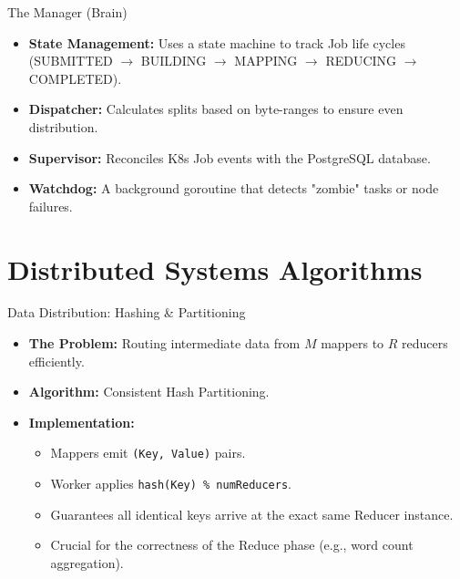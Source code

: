 \documentclass[10pt,aspectratio=169]{beamer}
\begin{document}
\begin{frame}{The Manager (Brain)}
    \begin{itemize}
        \item \textbf{State Management:} Uses a state machine to track Job life cycles (SUBMITTED $\to$ BUILDING $\to$ MAPPING $\to$ REDUCING $\to$ COMPLETED).
        \item \textbf{Dispatcher:} Calculates splits based on byte-ranges to ensure even distribution.
        \item \textbf{Supervisor:} Reconciles K8s Job events with the PostgreSQL database.
        \item \textbf{Watchdog:} A background goroutine that detects "zombie" tasks or node failures.
    \end{itemize}
\end{frame}

\section{Distributed Systems Algorithms}

\begin{frame}{Data Distribution: Hashing \& Partitioning}
    \begin{itemize}
        \item \textbf{The Problem:} Routing intermediate data from $M$ mappers to $R$ reducers efficiently.
        \item \textbf{Algorithm:} Consistent Hash Partitioning.
        \item \textbf{Implementation:} 
            \begin{itemize}
                \item Mappers emit \texttt{(Key, Value)} pairs.
                \item Worker applies \texttt{hash(Key) \% numReducers}.
                \item Guarantees all identical keys arrive at the exact same Reducer instance.
                \item Crucial for the correctness of the Reduce phase (e.g., word count aggregation).
            \end{itemize}
    \end{itemize}
\end{frame}
\end{document}
